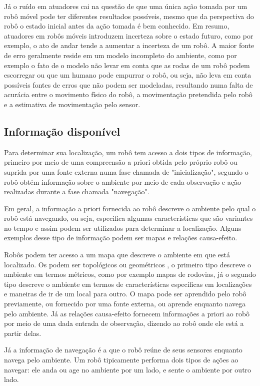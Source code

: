 \documentclass[acronym, symbols]{fei}
\begin{document}
			Já o ruído em atuadores cai na questão de que uma única ação tomada por um robô móvel pode ter diferentes resultados possíveis, mesmo que da perspectiva do robô o estado inicial antes da ação tomada é bem conhecido. Em resumo, atuadores em robôs móveis introduzem incerteza sobre o estado futuro, como por exemplo, o ato de andar tende a aumentar a incerteza de um robô. A maior fonte de erro geralmente reside em um modelo incompleto do ambiente, como por exemplo o fato de o modelo não levar em conta que as rodas de um robô podem escorregar ou que um humano pode empurrar o robô, ou seja, não leva em conta possíveis fontes de erros que não podem ser modeladas, resultando numa falta de acurácia entre o movimento físico do robô, a movimentação pretendida pelo robô e a estimativa de movimentação pelo sensor.
		
		\subsection{Informação disponível}
			
			Para determinar sua localização, um robô tem acesso a dois tipos de informação, primeiro por meio de uma compreensão a priori obtida pelo próprio robô ou suprida por uma fonte externa numa fase chamada de "inicialização", segundo o robô obtém informação sobre o ambiente por meio de cada observação e ação realizadas durante a fase chamada "navegação". 
			
			Em geral, a informação a priori fornecida ao robô descreve o ambiente pelo qual o robô está navegando, ou seja, especifica algumas características que são variantes no tempo e assim podem ser utilizados para determinar a localização. Alguns exemplos desse tipo de informação podem ser mapas e relações causa-efeito.
			
			Robôs podem ter acesso a um mapa que descreve o ambiente em que está localizado. Os podem ser topológicos ou geométricos \cite{singhal1997issues}, o primeiro tipo descreve o ambiente em termos métricos, como por exemplo mapas de rodovias, já o segundo tipo descreve o ambiente em termos de características específicas em localizações e maneiras de ir de um local para outro. O mapa pode ser aprendido pelo robô previamente, ou fornecido por uma fonte externa, ou aprende enquanto navega pelo ambiente. Já as relações causa-efeito fornecem informações a priori ao robô por meio de uma dada entrada de observação, dizendo ao robô onde ele está a partir delas. 
			
			Já a informação de navegação é a que o robô reúne de seus sensores enquanto navega pelo ambiente. Um robô tipicamente performa dois tipos de ações ao navegar: ele anda ou age no ambiente por um lado, e sente o ambiente por outro lado.
			
\end{document}
